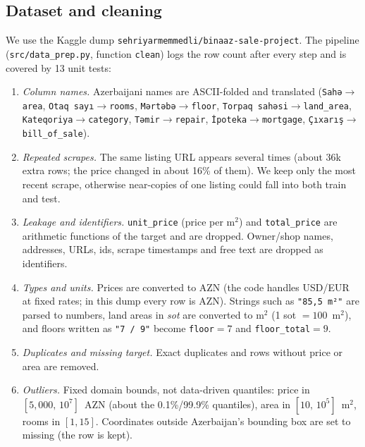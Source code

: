 \documentclass[10pt,twocolumn,a4paper]{article}
\begin{document}
\subsection{Dataset and cleaning}
We use the Kaggle dump \texttt{sehriyarmemmedli/binaaz-sale-project}. The
pipeline (\texttt{src/data\_prep.py}, function \texttt{clean}) logs the row
count after every step and is covered by 13 unit tests:
\begin{enumerate}
  \setlength\itemsep{0pt}
  \item \emph{Column names.} Azerbaijani names are ASCII-folded and
        translated (\texttt{Sahə}$\to$\texttt{area},
        \texttt{Otaq sayı}$\to$\texttt{rooms},
        \texttt{Mərtəbə}$\to$\texttt{floor},
        \texttt{Torpaq sahəsi}$\to$\texttt{land\_area},
        \texttt{Kateqoriya}$\to$\texttt{category},
        \texttt{Təmir}$\to$\texttt{repair},
        \texttt{İpoteka}$\to$\texttt{mortgage},
        \texttt{Çıxarış}$\to$\texttt{bill\_of\_sale}).
  \item \emph{Repeated scrapes.} The same listing URL appears several times
        (about 36k extra rows; the price changed in about 16\% of them). We
        keep only the most recent scrape, otherwise near-copies of one
        listing could fall into both train and test.
  \item \emph{Leakage and identifiers.} \texttt{unit\_price} (price per
        m$^2$) and \texttt{total\_price} are arithmetic functions of the
        target and are dropped. Owner/shop names, addresses, URLs, ids,
        scrape timestamps and free text are dropped as identifiers.
  \item \emph{Types and units.} Prices are converted to AZN (the code
        handles USD/EUR at fixed rates; in this dump every row is AZN).
        Strings such as \texttt{"85,5 m²"} are parsed to numbers, land
        areas in \emph{sot} are converted to m$^2$ (1 sot $=100$~m$^2$),
        and floors written as \texttt{"7 / 9"} become \texttt{floor}$=7$
        and \texttt{floor\_total}$=9$.
  \item \emph{Duplicates and missing target.} Exact duplicates and rows
        without price or area are removed.
  \item \emph{Outliers.} Fixed domain bounds, not data-driven quantiles:
        price in $[5{,}000,\,10^7]$~AZN (about the 0.1\%/99.9\%
        quantiles), area in $[10,\,10^5]$~m$^2$, rooms in $[1,15]$.
        Coordinates outside Azerbaijan's bounding box are set to missing
        (the row is kept).
\end{enumerate}
\end{document}
